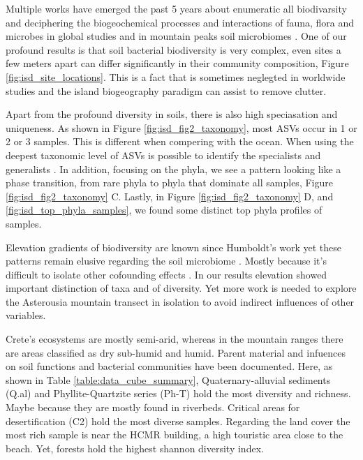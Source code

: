 Multiple works have emerged the past 5 years about enumeratic all
biodivarsity \parencite{Anthony2023} and deciphering the biogeochemical 
processes and interactions of fauna, flora and microbes in global
studies \parencite{Fry2019, Crowther2019,GRANDY201640,Delgado-Baquerizo2020} and
in mountain peaks soil microbiomes \parencite{Adamczyk2019}. One of our profound
results is that soil bacterial biodiversity is very complex, even sites a few meters apart can differ
significantly in their community composition, Figure \ref{fig:isd_site_locations}.
This is a fact that is sometimes neglegted in worldwide studies and the island biogeography
paradigm can assist to remove clutter.

Apart from the profound diversity in soils, there is also high speciasation and uniqueness. 
As shown in Figure \ref{fig:isd_fig2_taxonomy}, most ASVs occur in 1 or 2 or 3 samples.
This is different when compering with the ocean. When using the deepest taxonomic
level of ASVs is possible to identify the specialists and generalists \parencite{Barberan2012}. 
In addition, focusing on the phyla, we see a pattern looking like a phase transition, from 
rare phyla to phyla that dominate all samples, Figure \ref{fig:isd_fig2_taxonomy} C. Lastly, in Figure \ref{fig:isd_fig2_taxonomy} D,
and \ref{fig:isd_top_phyla_samples}, we found some distinct top phyla profiles of samples.

Elevation gradients of biodiversity are known since Humboldt's work \parencite{Rahbek2019} 
yet these patterns remain elusive regarding the soil microbiome \parencite{Looby2020, Siles2023}.
Mostly because it's difficult to isolate other cofounding effects \parencite{Nottingham2018}.
In our results elevation showed important distinction of taxa and of diversity. Yet more work is 
needed to explore the Asterousia mountain transect in isolation to avoid indirect influences of 
other variables.

Crete's ecosystems are mostly semi-arid, whereas in the mountain ranges there 
are areas classified as dry sub-humid and humid. Parent material and infuences
on soil functions and bacterial communities have been documented. Here, as shown in Table \ref{table:data_cube_summary},
Quaternary-alluvial sediments (Q.al) and Phyllite-Quartzite series (Ph-T) hold the most diversity 
and richness. Maybe because they are mostly found in riverbeds. Critical areas for 
desertification (C2) hold the most diverse samples. Regarding the land cover the most
rich sample is near the HCMR building, a high touristic area close to the beach. Yet, forests
hold the highest shannon diversity index.

